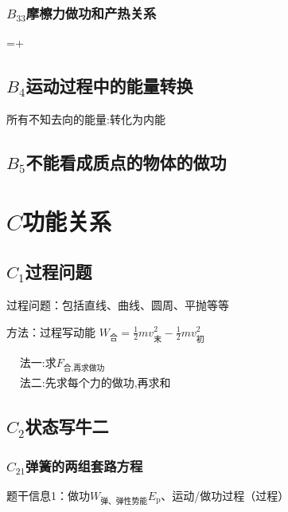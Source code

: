 \documentclass[lang=cn,10pt]{elegantbook}
\begin{document}
	         \vspace{2cm}
	          
	          \subsubsection{$B_{33}$摩檫力做功和产热关系}
	          =+
	          \subsection{$B_4$运动过程中的能量转换}
	          
	          所有不知去向的能量:转化为内能
	          \subsection{$B_5$不能看成质点的物体的做功}
	          
	          \section{$C$功能关系}
	          \subsection{$C_1$过程问题}
	          过程问题：包括直线、曲线、圆周、平抛等等
	          
	          方法：过程写动能 $W_{\text{合}}=\frac{1}{2}mv_{\text{末}}^{2}-\frac{1}{2}mv_{\text{初}}^{2}$
	          
	         $ \begin{aligned}&\text{法一:求}F_\text{合,再求做功}\\&\text{法二:先求每个力的做功,再求和}\end{aligned}$
	         
	         \subsection{$C_2$状态写牛二}
		      \subsubsection{$C_{21} $弹簧的两组套路方程}
		      
		      题干信息1：做功$W_\text{弹、弹性势能}E_\mathrm{p}$、运动/做功过程（过程）
		      
\end{document}

